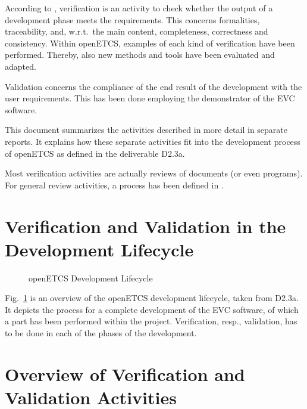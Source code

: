 \documentclass{template/openetcs_article}
\begin{document}
According to \cite[3.1.48]{EN50128:2011}, verification is an activity
to check whether the output of a development phase meets the
requirements. This concerns formalities, traceability, and, w.r.t.\
the main content, completeness, correctness and consistency. Within
openETCS, examples of each kind of verification have been
performed. Thereby, also new methods and tools have been evaluated and
adapted. 

Validation concerns the compliance of the end result of the
development with the user requirements. This has been done employing
the demonstrator of the EVC software. 

This document summarizes the activities described in more detail in
separate reports. It explains how these separate activities fit into
the development process of openETCS as defined in the deliverable
D2.3a.    

Most verification activities are actually reviews of documents (or
even programs). For general review activities, a process has been
defined in \cite{openETCS:D1.3.1}. 

\newpage







\section{Verification and Validation in the Development Lifecycle}
\label{sec:Lifecycle}

\begin{figure}[hbt]
  \centering
  \def\svgwidth{.9\textwidth}
  {\tiny
  }
  \caption{openETCS Development Lifecycle}
  \label{fig:lifecycle2}
\end{figure}

Fig.~\ref{fig:lifecycle2} is an overview of the openETCS development
lifecycle, taken from D2.3a. It depicts the process for a complete
development of the EVC software, of which a part has been performed
within the project. Verification, resp., validation, has to be done in
each of the phases of the development.

\section{Overview of Verification and Validation Activities}
\label{sec:overview}
\end{document}
